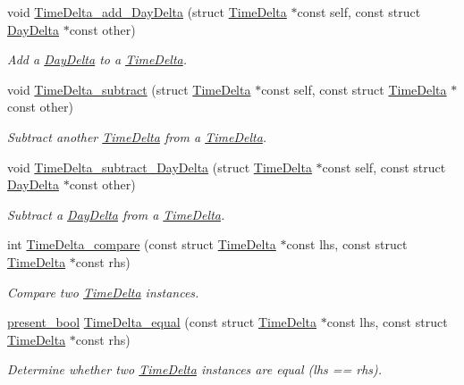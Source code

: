 \begin{DoxyCompactItemize}
void \hyperlink{time-delta_8h_a80aa67e85468bf70b53e1eecd3f3e4cd}{Time\-Delta\-\_\-add\-\_\-\-Day\-Delta} (struct \hyperlink{structTimeDelta}{Time\-Delta} $\ast$const self, const struct \hyperlink{structDayDelta}{Day\-Delta} $\ast$const other)
\begin{DoxyCompactList}\small\item\em Add a \hyperlink{structDayDelta}{Day\-Delta} to a \hyperlink{structTimeDelta}{Time\-Delta}. \end{DoxyCompactList}\item 
void \hyperlink{time-delta_8h_aabc9864d36d4b617bccd6af5baba8fa2}{Time\-Delta\-\_\-subtract} (struct \hyperlink{structTimeDelta}{Time\-Delta} $\ast$const self, const struct \hyperlink{structTimeDelta}{Time\-Delta} $\ast$const other)
\begin{DoxyCompactList}\small\item\em Subtract another \hyperlink{structTimeDelta}{Time\-Delta} from a \hyperlink{structTimeDelta}{Time\-Delta}. \end{DoxyCompactList}\item 
void \hyperlink{time-delta_8h_a4c1cce3fe60da8412454e06e9b4a8a1d}{Time\-Delta\-\_\-subtract\-\_\-\-Day\-Delta} (struct \hyperlink{structTimeDelta}{Time\-Delta} $\ast$const self, const struct \hyperlink{structDayDelta}{Day\-Delta} $\ast$const other)
\begin{DoxyCompactList}\small\item\em Subtract a \hyperlink{structDayDelta}{Day\-Delta} from a \hyperlink{structTimeDelta}{Time\-Delta}. \end{DoxyCompactList}\item 
int \hyperlink{time-delta_8h_a1864d69bcd1b4cf445555bc72c21a653}{Time\-Delta\-\_\-compare} (const struct \hyperlink{structTimeDelta}{Time\-Delta} $\ast$const lhs, const struct \hyperlink{structTimeDelta}{Time\-Delta} $\ast$const rhs)
\begin{DoxyCompactList}\small\item\em Compare two \hyperlink{structTimeDelta}{Time\-Delta} instances. \end{DoxyCompactList}\item 
\hyperlink{types_8h_a1c24e2cdd988b886e889080ded176ae0}{present\-\_\-bool} \hyperlink{time-delta_8h_a99614ad03a84af18cd60d8b25d5c4cee}{Time\-Delta\-\_\-equal} (const struct \hyperlink{structTimeDelta}{Time\-Delta} $\ast$const lhs, const struct \hyperlink{structTimeDelta}{Time\-Delta} $\ast$const rhs)
\begin{DoxyCompactList}\small\item\em Determine whether two \hyperlink{structTimeDelta}{Time\-Delta} instances are equal (lhs == rhs). \end{DoxyCompactList}\item 

\end{DoxyCompactItemize}
